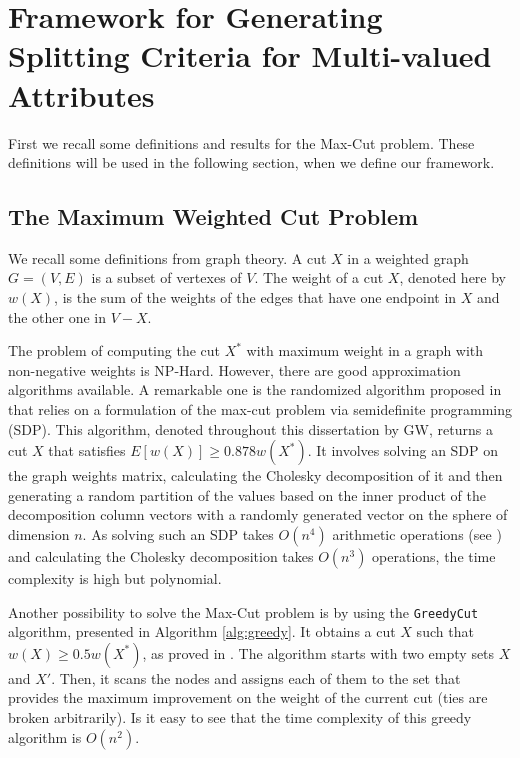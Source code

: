 \newpage

\chapter{Framework for Generating Splitting Criteria for Multi-valued Attributes}
\label{chap:framework}

First we recall some definitions and results for the Max-Cut problem. These definitions will be used in the following section, when we define our framework.

\section{The Maximum Weighted Cut Problem}
\label{sec:maxcutbackground}

We  recall some definitions from graph theory. A cut  $X$ in  a weighted graph $G=(V,E)$ is
a subset of vertexes of $V$. The weight of a cut $X$, denoted here by $w(X)$, is the sum of the weights
of the edges that have one endpoint in $X$ and the other one in $V-X$.

The problem of computing the  cut $X^*$ with maximum weight in a graph with non-negative weights is NP-Hard.
However, there are good  approximation algorithms
available. A remarkable one is the randomized algorithm
 proposed in  \cite{GoeWil95} that relies on a formulation of
the max-cut problem via semidefinite programming (SDP). This algorithm,  denoted throughout this dissertation by GW, 
returns a cut $X$ that satisfies  $E[w(X)] \ge 0.878 w(X^*)$. It involves solving an SDP on the graph weights matrix, calculating the Cholesky decomposition of it and then generating a random partition of the values based on the inner product of the decomposition column vectors with a randomly generated vector on the sphere of dimension $n$. As solving such an SDP takes $O(n^4)$ arithmetic operations (see \cite{navascues2009power}) and calculating the Cholesky decomposition takes $O(n^3)$ operations, the time complexity is high but polynomial.

Another possibility to solve the Max-Cut problem is by using the {\tt GreedyCut} algorithm, presented in Algorithm \ref{alg:greedy}. It
obtains a cut $X$ such that $w(X)  \ge 0.5 w(X^*)$, as proved in \cite{SahGon:76}.
The algorithm starts with two empty sets $X$ and $X'$. Then, it
scans the nodes 
and assigns each of them to the set that provides
the maximum improvement on  the weight of the current cut (ties are broken arbitrarily). Is it easy to see that the time complexity of this greedy algorithm is $O(n^2)$.


